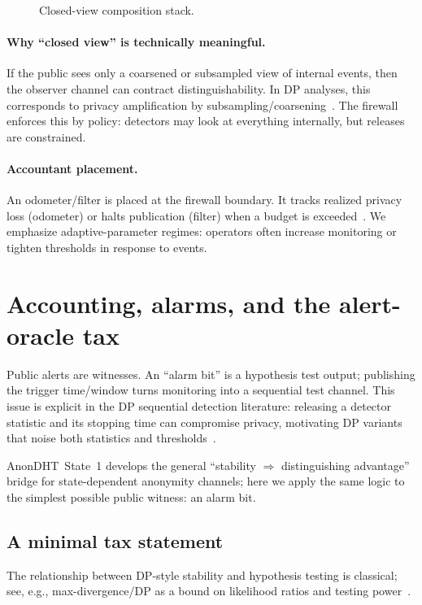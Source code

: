 \documentclass[11pt]{article}
\begin{document}
\begin{figure}[t]
  \centering
  \caption{Closed-view composition stack.}
\end{figure}

\paragraph{Why ``closed view'' is technically meaningful.}
If the public sees only a coarsened or subsampled view of internal events, then the observer channel can contract distinguishability.
In DP analyses, this corresponds to privacy amplification by subsampling/coarsening~\cite{balle2018subsampling}.
The firewall enforces this by policy: detectors may look at everything internally, but releases are constrained.

\paragraph{Accountant placement.}
An odometer/filter is placed at the firewall boundary.
It tracks realized privacy loss (odometer) or halts publication (filter) when a budget is exceeded~\cite{rogers2016odometers}.
We emphasize adaptive-parameter regimes: operators often increase monitoring or tighten thresholds in response to events.


\section{Accounting, alarms, and the alert-oracle tax}
\label{sec:alerts}

Public alerts are witnesses.
An ``alarm bit'' is a hypothesis test output; publishing the trigger time/window turns monitoring into a sequential test channel.
This issue is explicit in the DP sequential detection literature: releasing a detector statistic and its stopping time can compromise privacy, motivating DP variants that noise both statistics and thresholds~\cite{xie2025dpcusum}.

AnonDHT~State~1 develops the general ``stability $\Rightarrow$ distinguishing advantage'' bridge for state-dependent anonymity channels; here we apply the same logic to the simplest possible public witness: an alarm bit.


\subsection{A minimal tax statement}
The relationship between DP-style stability and hypothesis testing is classical; see, e.g., max-divergence/DP as a bound on likelihood ratios and testing power~\cite{dworkroth2014foundations,balle2020rdp_testing}.
\end{document}
